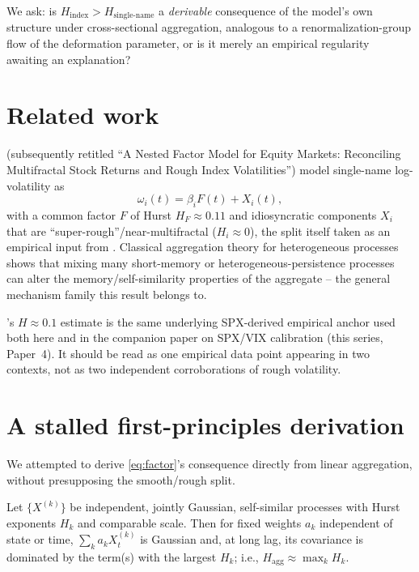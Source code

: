 \documentclass[11pt]{article}
\begin{document}
We ask: is $H_{\text{index}} > H_{\text{single-name}}$ a \emph{derivable} consequence of the model's own structure under cross-sectional aggregation, analogous to a renormalization-group flow of the deformation parameter, or is it merely an empirical regularity awaiting an explanation?

\section{Related work}

\citet{zarhali2025nested} (subsequently retitled ``A Nested Factor Model for Equity Markets: Reconciling Multifractal Stock Returns and Rough Index Volatilities'') model single-name log-volatility as
\begin{equation}
\omega_i(t) = \beta_i F(t) + X_i(t), \label{eq:factor}
\end{equation}
with a common factor $F$ of Hurst $H_F\approx0.11$ and idiosyncratic components $X_i$ that are ``super-rough''/near-multifractal ($H_i\approx0$), the split itself taken as an empirical input from \citet{wu2022rough}. Classical aggregation theory for heterogeneous processes \citep{granger1980long,zaffaroni2004aggregation} shows that mixing many short-memory or heterogeneous-persistence processes can alter the memory/self-similarity properties of the aggregate -- the general mechanism family this result belongs to.

\begin{finding}
\citet{gatheral2018volatility}'s $H\approx0.1$ estimate is the same underlying SPX-derived empirical anchor used both here and in the companion paper on SPX/VIX calibration (this series, Paper~4). It should be read as one empirical data point appearing in two contexts, not as two independent corroborations of rough volatility.
\end{finding}

\section{A stalled first-principles derivation}

We attempted to derive \eqref{eq:factor}'s consequence directly from linear aggregation, without presupposing the smooth/rough split.

\begin{proposition}
Let $\{X^{(k)}\}$ be independent, jointly Gaussian, self-similar processes with Hurst exponents $H_k$ and comparable scale. Then for fixed weights $a_k$ independent of state or time, $\sum_k a_k X^{(k)}_t$ is Gaussian and, at long lag, its covariance is dominated by the term(s) with the largest $H_k$; i.e., $H_{\mathrm{agg}} \approx \max_k H_k$.
\end{proposition}
\end{document}

